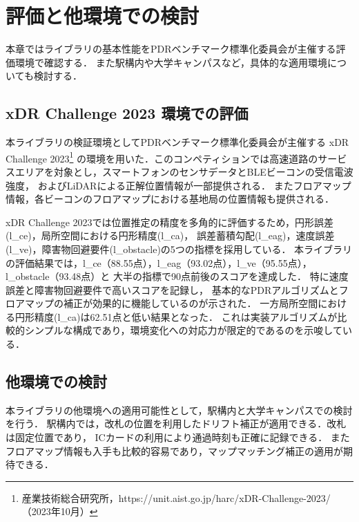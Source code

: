 \documentclass[a4paper, 10pt, twocolumn]{jarticle}
\begin{document}
\section{評価と他環境での検討}

本章ではライブラリの基本性能をPDRベンチマーク標準化委員会が主催する評価環境で確認する．
また駅構内や大学キャンパスなど，具体的な適用環境についても検討する．


\subsection{xDR Challenge 2023 環境での評価}

本ライブラリの検証環境としてPDRベンチマーク標準化委員会が主催する
xDR Challenge 2023\footnote{産業技術総合研究所，https://unit.aist.go.jp/harc/xDR-Challenge-2023/（2023年10月）}
の環境を用いた．このコンペティションでは高速道路のサービスエリアを対象とし，スマートフォンのセンサデータとBLEビーコンの受信電波強度，
およびLiDARによる正解位置情報が一部提供される．
またフロアマップ情報，各ビーコンのフロアマップにおける基地局の位置情報も提供される．

xDR Challenge 2023では位置推定の精度を多角的に評価するため，円形誤差(l\_ce)，局所空間における円形精度(l\_ca)，
誤差蓄積勾配(l\_eag)，速度誤差(l\_ve)，障害物回避要件(l\_obstacle)の5つの指標を採用している．
本ライブラリの評価結果では，l\_ce（88.55点），l\_eag（93.02点），l\_ve（95.55点），l\_obstacle（93.48点）と
大半の指標で90点前後のスコアを達成した．
特に速度誤差と障害物回避要件で高いスコアを記録し，
基本的なPDRアルゴリズムとフロアマップの補正が効果的に機能しているのが示された．
一方局所空間における円形精度(l\_ca)は62.51点と低い結果となった．
これは実装アルゴリズムが比較的シンプルな構成であり，環境変化への対応力が限定的であるのを示唆している．


\subsection{他環境での検討}
本ライブラリの他環境への適用可能性として，駅構内と大学キャンパスでの検討を行う．
駅構内では，改札の位置を利用したドリフト補正が適用できる．改札は固定位置であり，
ICカードの利用により通過時刻も正確に記録できる．
またフロアマップ情報も入手も比較的容易であり，マップマッチング補正の適用が期待できる．
\end{document}
